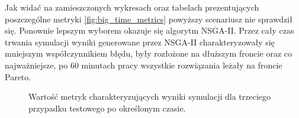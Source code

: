 \documentclass[twoside]{iisthesis}
\begin{document}
Jak widać na zamieszczonych wykresach oraz tabelach prezentujących poszczególne metryki \eqref{fig:big_time_metrics} powyższy scenariusz nie sprawdził się. Ponownie lepszym wyborem okazuje się algorytm NSGA-II. Przez cały czas trwania symulacji wyniki generowane przez NSGA-II charakteryzowały się mniejszym współczynnikiem błędu, były rozłożone na dłuższym froncie oraz co najważniejsze, po 60 minutach pracy wszystkie rozwiązania leżały na froncie Pareto.
\begin{figure}\centering
{}
    \hfill
{}

    \hfill
{}
\caption{Wartość metryk charakteryzujących wyniki symulacji dla trzeciego przypadku testowego po określonym czasie.}
    \label{fig:big_time_metrics}
\end{figure}
\end{document}
